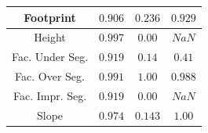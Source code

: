 \documentclass[portrait, a0paper, margin=.5cm]{baposter}
\begin{document}
\begin{poster}
{\begin{center}
\begin{tabular}{c c c c}
                    \midrule
                    Footprint & $0.906$ & $0.236$ & $0.929$ \\
                    \midrule
                    Height & $0.997$ & $0.00$ & $NaN$ \\
                    \midrule
                    Fac. Under Seg. & $0.919$ & $0.14$ & $0.41$ \\
                    \midrule
                    Fac. Over Seg. & $0.991$ & $1.00$ & $0.988$ \\
                    \midrule
                    Fac. Impr. Seg. & $0.919$ & $0.00$ & $NaN$\\
                    \midrule
                    Slope & $0.974$ & $0.143$ & $1.00$\\
                    \bottomrule
                \end{tabular}
            \end{center}
            \vspace{.1cm}
        }


\end{poster}
\end{document}
